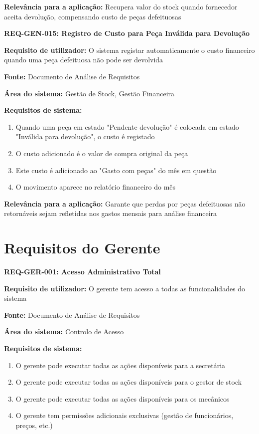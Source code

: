 \documentclass[11pt,a4paper]{article}
\newcommand{\reqheader}[1]{{\noindent\large\bfseries\color{sectionblue}#1}\par\vspace{0.3cm}}
\newcommand{\reqfield}[2]{{\noindent\textbf{#1:} #2}\par\vspace{0.2cm}}
\begin{document}
\reqfield{Relevância para a aplicação}{Recupera valor do stock quando fornecedor aceita devolução, compensando custo de peças defeituosas}

\vspace{0.8cm}

\reqheader{REQ-GEN-015: Registro de Custo para Peça Inválida para Devolução}

\reqfield{Requisito de utilizador}{O sistema registar automaticamente o custo financeiro quando uma peça defeituosa não pode ser devolvida}

\reqfield{Fonte}{Documento de Análise de Requisitos}

\reqfield{Área do sistema}{Gestão de Stock, Gestão Financeira}

\reqfield{Requisitos de sistema}{
	\begin{enumerate}
		\item Quando uma peça em estado "Pendente devolução" é colocada em estado "Inválida para devolução", o custo é registado
		\item O custo adicionado é o valor de compra original da peça
		\item Este custo é adicionado ao "Gasto com peças" do mês em questão
		\item O movimento aparece no relatório financeiro do mês
	\end{enumerate}
}

\reqfield{Relevância para a aplicação}{Garante que perdas por peças defeituosas não retornáveis sejam refletidas nos gastos mensais para análise financeira}

\vspace{1.5cm}


\section*{Requisitos do Gerente}

\reqheader{REQ-GER-001: Acesso Administrativo Total}

\reqfield{Requisito de utilizador}{O gerente tem acesso a todas as funcionalidades do sistema}

\reqfield{Fonte}{Documento de Análise de Requisitos}

\reqfield{Área do sistema}{Controlo de Acesso}

\reqfield{Requisitos de sistema}{
	\begin{enumerate}
		\item O gerente pode executar todas as ações disponíveis para a secretária
		\item O gerente pode executar todas as ações disponíveis para o gestor de stock
		\item O gerente pode executar todas as ações disponíveis para os mecânicos
		\item O gerente tem permissões adicionais exclusivas (gestão de funcionários, preços, etc.)
	\end{enumerate}
}
\end{document}
